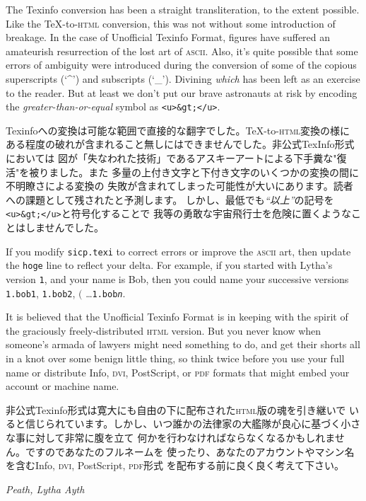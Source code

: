 \documentclass[8pt,oneside]{book}
\newcommand{\acronym}[1]{\textsc{\MakeLowercase{#1}}}
\newcommand{\code}[1]{\texttt{#1}}
\begin{document}
The Texinfo conversion has been a straight transliteration, to the extent
possible.  Like the {\TeX}-to-\acronym{HTML} conversion, this was not without
some introduction of breakage.  In the case of Unofficial Texinfo Format,
figures have suffered an amateurish resurrection of the lost art of
\acronym{ASCII}.  Also, it's quite possible that some errors of ambiguity
were introduced during the conversion of some of the copious superscripts (`\^{}')
and subscripts (`\_').  Divining \emph{which} has been left as an exercise to
the reader. But at least we don't put our brave astronauts at risk by encoding
the \emph{greater-than-or-equal} symbol as \code{<u>\&gt;</u>}.

Texinfoへの変換は可能な範囲で直接的な翻字でした。{\TeX}-to-\acronym{HTML}変換の様に
ある程度の破れが含まれること無しにはできませんでした。非公式TexInfo形式においては
図が「失なわれた技術」であるアスキーアートによる下手糞な"復活"を被りました。また
多量の上付き文字と下付き文字のいくつかの変換の間に不明瞭さによる変換の
失敗が含まれてしまった可能性が大いにあります。読者への課題として残されたと予測します。
しかし、最低でも\emph{``以上''}の記号を\texttt{<u>\&gt;</u>}と符号化することで
我等の勇敢な宇宙飛行士を危険に置くようなことはしませんでした。

If you modify \texttt{sicp.texi} to correct errors or improve the
\acronym{ASCII} art, then update the \code{hoge}
line to reflect your delta.  For example, if you started with Lytha's version
\code{1}, and your name is Bob, then you could name your successive versions
\code{1.bob1}, \code{1.bob2}, $($ \dots \code{1.bob\textit{n}}. 

It is believed that the Unofficial Texinfo Format is in keeping with the
spirit of the graciously freely-distributed \acronym{HTML} version.  But you
never know when someone's armada of lawyers might need something to do, and get
their shorts all in a knot over some benign little thing, so think twice before
you use your full name or distribute Info, \acronym{DVI}, PostScript, or
\acronym{PDF} formats that might embed your account or machine name.

非公式Texinfo形式は寛大にも自由の下に配布された\acronym{HTML}版の魂を引き継いで
いると信じられています。しかし、いつ誰かの法律家の大艦隊が良心に基づく小さな事に対して非常に腹を立て
何かを行わなければならなくなるかもしれません。ですのであなたのフルネームを
使ったり、あなたのアカウントやマシン名を含むInfo, \acronym{DVI}, PostScript, \acronym{PDF}形式
を配布する前に良く良く考えて下さい。

\noindent
\textit{Peath, Lytha Ayth}
\end{document}
